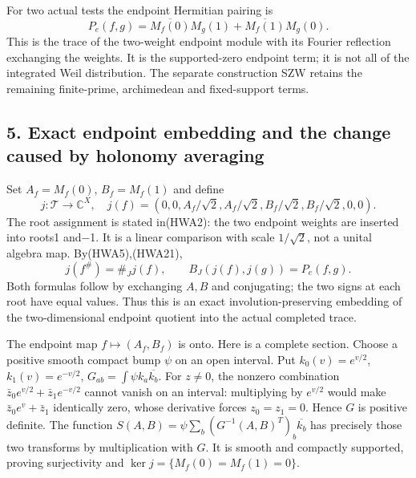 \documentclass[
  10pt,
  a4paper,
]{article}
\begin{document}
For two actual tests the endpoint Hermitian pairing is \[
P_e(f,g)=\overline{M_f(0)}M_g(1)+\overline{M_f(1)}M_g(0).
\tag{HWA27}
\] This is the trace of the two-weight endpoint module with its Fourier
reflection exchanging the weights. It is the supported-zero endpoint
term; it is not all of the integrated Weil distribution. The separate
construction SZW retains the remaining finite-prime, archimedean and
fixed-support terms.

\subsection{5. Exact endpoint embedding and the change caused by
holonomy
averaging}\label{exact-endpoint-embedding-and-the-change-caused-by-holonomy-averaging}

Set \(A_f=M_f(0)\), \(B_f=M_f(1)\) and define \[
j:\mathcal T\to\mathbb C^X,
\quad j(f)=(0,0,A_f/\sqrt2,A_f/\sqrt2,
B_f/\sqrt2,B_f/\sqrt2,0,0).
\tag{HWA28}
\] The root assignment is stated in(HWA2): the two endpoint weights are
inserted into roots1 and−1. It is a linear comparison with scale
\(1/\sqrt2\), not a unital algebra map. By(HWA5),(HWA21), \[
j(f^\#)=\#_Jj(f),\qquad
B_J(j(f),j(g))=P_e(f,g).
\tag{HWA29}
\] Both formulas follow by exchanging \(A,B\) and conjugating; the two
signs at each root have equal values. Thus this is an exact
involution-preserving embedding of the two-dimensional endpoint quotient
into the actual completed trace.

The endpoint map \(f\mapsto(A_f,B_f)\) is onto. Here is a complete
section. Choose a positive smooth compact bump \(\psi\) on an open
interval. Put \(k_0(v)=e^{v/2}\), \(k_1(v)=e^{-v/2}\),
\(G_{ab}=\int\psi k_a\overline{k_b}\). For \(z\ne0\), the nonzero
combination \(\bar z_0e^{v/2}+\bar z_1e^{-v/2}\) cannot vanish on an
interval: multiplying by \(e^{v/2}\) would make \(\bar z_0e^v+\bar z_1\)
identically zero, whose derivative forces \(z_0=z_1=0\). Hence \(G\) is
positive definite. The function
\(S(A,B)=\psi\sum_b(G^{-1}(A,B)^T)_b\overline{k_b}\) has precisely those
two transforms by multiplication with \(G\). It is smooth and compactly
supported, proving surjectivity and \(\ker j=\{M_f(0)=M_f(1)=0\}\).
\end{document}
